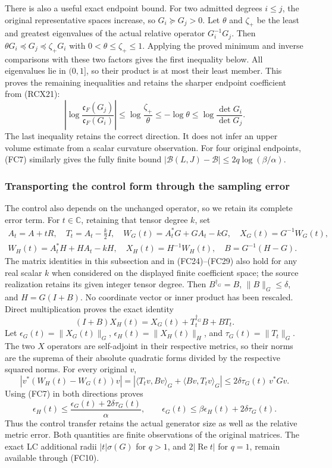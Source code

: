 There is also a useful exact endpoint bound. For two admitted degrees
$i\le j$, the original representative spaces increase, so $G_i\succeq
G_j>0$. Let $\theta$ and $\zeta_+$ be the least and greatest
eigenvalues of the actual relative operator $G_i^{-1}G_j$.
Then $\theta G_i\preceq G_j\preceq\zeta_+G_i$ with
$0<\theta\le\zeta_+\le1$. Applying the proved minimum and inverse
comparisons with these two factors gives the first inequality below.
All eigenvalues lie in $(0,1]$, so their product is at most their
least member. This proves the remaining inequalities and retains
the sharper endpoint coefficient from (RCX21):
\[
 \left|\log\frac{\mathfrak c_F(G_j)}{\mathfrak c_F(G_i)}\right|
 \le\log\frac{\zeta_+}{\theta}
 \le-\log\theta\le\log\frac{\det G_i}{\det G_j}.
 \tag{FC13}
\]
The last inequality retains the correct direction. It does not infer
an upper volume estimate from a scalar curvature observation.
For four original endpoints, (FC7) similarly gives the fully finite
bound $|\mathcal B(L,J)-\mathcal B|\le2q\log(\beta/\alpha)$.

\subsubsection{Transporting the control form through the sampling error}

The control also depends on the unchanged operator, so we retain its
complete error term. For $t\in\mathbb C$, retaining that tensor degree
$k$, set
\[
\begin{gathered}
 A_t=A+tR,\quad T_t=A_t-\tfrac k2I,\quad
 W_G(t)=A_t^*G+GA_t-kG,\quad X_G(t)=G^{-1}W_G(t),\\
 W_H(t)=A_t^*H+HA_t-kH,\quad X_H(t)=H^{-1}W_H(t),\quad
 B=G^{-1}(H-G).
\end{gathered}\tag{FC14}
\]
The matrix identities in this subsection and in (FC24)--(FC29)
also hold for any real scalar $k$ when considered on the displayed
finite coefficient space; the source realization retains its given
integer tensor degree.
Then $B^{\dagger_G}=B$, $\|B\|_G\le\delta$, and $H=G(I+B)$.
No coordinate vector or inner product has been rescaled. Direct
multiplication proves the exact identity
\[
 (I+B)X_H(t)=X_G(t)+T_t^{\dagger_G}B+BT_t.
 \tag{FC15}
\]
Let $\epsilon_G(t)=\|X_G(t)\|_G$, $\epsilon_H(t)=\|X_H(t)\|_H$,
and $\tau_G(t)=\|T_t\|_G$. The two $X$ operators are self-adjoint
in their respective metrics, so their norms are the suprema of their
absolute quadratic forms divided by the respective squared norms.
For every original $v$,
\[
 |v^*(W_H(t)-W_G(t))v|
 =|\langle T_tv,Bv\rangle_G+\langle Bv,T_tv\rangle_G|
 \le2\delta\tau_G(t)\,v^*Gv.
 \tag{FC16}
\]
Using (FC7) in both directions proves
\[
 \boxed{\epsilon_H(t)\le
  \frac{\epsilon_G(t)+2\delta\tau_G(t)}{\alpha},\qquad
 \epsilon_G(t)\le\beta\epsilon_H(t)+2\delta\tau_G(t).}
 \tag{FC17}
\]
Thus the control transfer retains the actual generator size as well as
the relative metric error. Both quantities are finite observations of
the original matrices. The exact LC additional radii
$|t|\sigma(G)$ for $q>1$, and $2|\operatorname{Re}t|$ for $q=1$,
remain available through (FC10).

